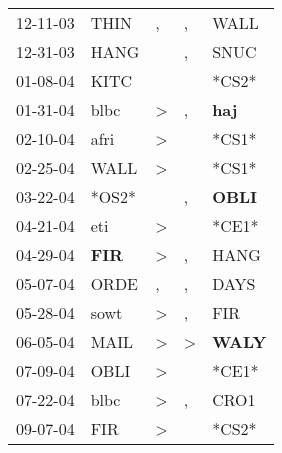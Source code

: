 \begin{supertabular}{p{0.07\textwidth}p{0.06\textwidth}p{0.02\textwidth}p{0.02\textwidth}p{0.06\textwidth}}
 12-11-03\textsuperscript{} &           THIN\textsuperscript{} &                , &                , &           WALL\textsuperscript{} \\
 12-31-03\textsuperscript{} &           HANG\textsuperscript{} &                  &                , &           SNUC\textsuperscript{} \\
 01-08-04\textsuperscript{} &           KITC\textsuperscript{} &                  &                  &                            *CS2* \\
 01-31-04\textsuperscript{} &           blbc\textsuperscript{} &     \textgreater &                , &   \textbf{haj\textsuperscript{}} \\
 02-10-04\textsuperscript{} &           afri\textsuperscript{} &     \textgreater &                  &                            *CS1* \\
 02-25-04\textsuperscript{} &           WALL\textsuperscript{} &     \textgreater &                  &                            *CS1* \\
 03-22-04\textsuperscript{} &                            *OS2* &                  &                , &  \textbf{OBLI\textsuperscript{}} \\
 04-21-04\textsuperscript{} &            eti\textsuperscript{} &     \textgreater &                  &                            *CE1* \\
 04-29-04\textsuperscript{} &   \textbf{FIR\textsuperscript{}} &     \textgreater &                , &           HANG\textsuperscript{} \\
 05-07-04\textsuperscript{} &           ORDE\textsuperscript{} &                , &                , &           DAYS\textsuperscript{} \\
 05-28-04\textsuperscript{} &           sowt\textsuperscript{} &     \textgreater &                , &            FIR\textsuperscript{} \\
 06-05-04\textsuperscript{} &           MAIL\textsuperscript{} &     \textgreater &     \textgreater &  \textbf{WALY\textsuperscript{}} \\
 07-09-04\textsuperscript{} &           OBLI\textsuperscript{} &     \textgreater &                  &                            *CE1* \\
 07-22-04\textsuperscript{} &           blbc\textsuperscript{} &     \textgreater &                , &           CRO1\textsuperscript{} \\
 09-07-04\textsuperscript{} &            FIR\textsuperscript{} &     \textgreater &                  &                            *CS2* \\

\end{supertabular}
